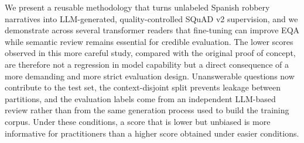 \documentclass[graybox]{SNmult}
\begin{document}
We present a reusable methodology that turns unlabeled Spanish robbery narratives into LLM-generated, quality-controlled SQuAD v2 supervision, and we demonstrate across several transformer readers that fine-tuning can improve EQA while semantic review remains essential for credible evaluation. The lower scores observed in this more careful study, compared with the original proof of concept, are therefore not a regression in model capability but a direct consequence of a more demanding and more strict evaluation design. Unanswerable questions now contribute to the test set, the context-disjoint split prevents leakage between partitions, and the evaluation labels come from an independent LLM-based review rather than from the same generation process used to build the training corpus. Under these conditions, a score that is lower but unbiased is more informative for practitioners than a higher score obtained under easier conditions.

% 
% 
% 
% 
\end{document}
